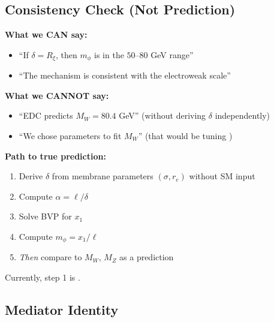 \subsection{Consistency Check (Not Prediction)}

\begin{tcolorbox}[colback=cyan!5!white, colframe=cyan!50!black,
    title=\textbf{Important: This Is a Consistency Check}]

\textbf{What we CAN say:}
\begin{itemize}[nosep]
\item ``If $\delta = R_\xi$, then $m_\phi$ is in the $50$--$80$ GeV range''
\item ``The mechanism is consistent with the electroweak scale''
\end{itemize}

\textbf{What we CANNOT say:}
\begin{itemize}[nosep]
\item ``EDC predicts $M_W = 80.4$ GeV'' (without deriving $\delta$ independently)
\item ``We chose parameters to fit $M_W$'' (that would be tuning \tagCal{})
\end{itemize}

\textbf{Path to true prediction:}
\begin{enumerate}[nosep]
\item Derive $\delta$ from membrane parameters $(\sigma, r_e)$ without SM input
\item Compute $\alpha = \ell/\delta$
\item Solve BVP for $x_1$
\item Compute $m_\phi = x_1/\ell$
\item \textit{Then} compare to $M_W$, $M_Z$ as a prediction
\end{enumerate}

Currently, step 1 is \tagOpen{}.
\end{tcolorbox}

\subsection{Mediator Identity}

